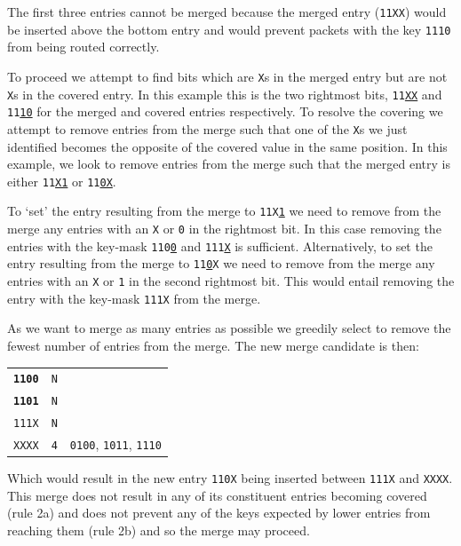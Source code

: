 \documentclass[conference]{IEEEtran}
\newcommand{\mytt}[1]{\texttt{\footnotesize#1}}
\begin{document}
  The first three entries cannot be merged because the merged entry (\mytt{11XX}) would be inserted above the bottom entry and would prevent packets with the key \mytt{1110} from being routed correctly.

  To proceed we attempt to find bits which are \mytt{X}s in the merged entry but are not \mytt{X}s in the covered entry.
  In this example this is the two rightmost bits, \mytt{11\underline{XX}} and \mytt{11\underline{10}} for the merged and covered entries respectively.
  To resolve the covering we attempt to remove entries from the merge such that one of the \mytt{X}s we just identified becomes the opposite of the covered value in the same position.
  In this example, we look to remove entries from the merge such that the merged entry is either \mytt{11\underline{X1}} or \mytt{11\underline{0X}}.

  To `set' the entry resulting from the merge to \mytt{11X\underline{1}} we need to remove from the merge any entries with an \mytt{X} or \mytt{0} in the rightmost bit.
  In this case removing the entries with the key-mask \mytt{110\underline{0}} and \mytt{111\underline{X}} is sufficient.
  Alternatively, to set the entry resulting from the merge to \mytt{11\underline{0}X} we need to remove from the merge any entries with an \mytt{X} or \mytt{1} in the second rightmost bit.
  This would entail removing the entry with the key-mask \mytt{111X} from the merge.

  As we want to merge as many entries as possible we greedily select to remove the fewest number of entries from the merge.
  The new merge candidate is then:

  \begin{table}[H]
    \centering
    \begin{tabular}{c l l}
      \toprule
      \textbf{\texttt{1100}} & \texttt{N} \\
      \textbf{\texttt{1101}} & \texttt{N} \\
      \texttt{111X} & \texttt{N} \\
      \texttt{XXXX} & \texttt{4} & \texttt{0100}, \texttt{1011}, \texttt{1110} \\
      \bottomrule
    \end{tabular}
  \end{table}

  Which would result in the new entry \mytt{110X} being inserted between \mytt{111X} and \mytt{XXXX}.
  This merge does not result in any of its constituent entries becoming covered (rule 2a) and does not prevent any of the keys expected by lower entries from reaching them (rule 2b) and so the merge may proceed.
\end{document}
